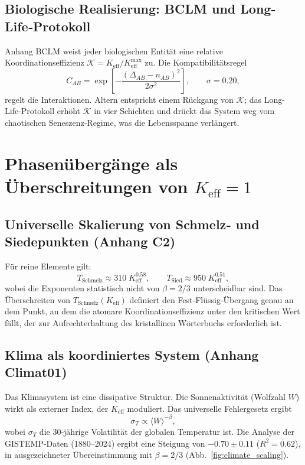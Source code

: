 \documentclass[12pt,a4paper]{article}
\newcommand{\Keff}{K_{\mathrm{eff}}}
\newcommand{\REL}{\mathcal{K}}
\begin{document}
	\subsection{Biologische Realisierung: BCLM und Long-Life‑Protokoll}
	
	Anhang BCLM weist jeder biologischen Entität eine relative Koordinationseffizienz
	$\REL = \Keff/\Keff^{\max}$ zu. Die Kompatibilitätsregel
	\[
	C_{AB} = \exp\!\left[-\frac{(\Delta_{AB} - n_{AB})^2}{2\sigma^2}\right],\qquad \sigma = 0.20,
	\]
	regelt die Interaktionen. Altern entspricht einem Rückgang von $\REL$; das Long-Life‑Protokoll
	erhöht $\REL$ in vier Schichten und drückt das System weg vom chaotischen Seneszenz‑Regime,
	was die Lebensspanne verlängert.
	
	\section{Phasenübergänge als Überschreitungen von $\Keff = 1$}
	
	\subsection{Universelle Skalierung von Schmelz‑ und Siedepunkten (Anhang C2)}
	
	Für reine Elemente gilt:
	\[
	T_{\text{Schmelz}} \approx 310\;\Keff^{0.58}, \qquad
	T_{\text{Sied}} \approx 950\;\Keff^{0.51},
	\]
	wobei die Exponenten statistisch nicht von $\beta = 2/3$ unterscheidbar sind. Das Überschreiten
	von $T_{\text{Schmelz}}(\Keff)$ definiert den Fest‑Flüssig‑Übergang genau an dem Punkt, an dem die
	atomare Koordinationseffizienz unter den kritischen Wert fällt, der zur Aufrechterhaltung des
	kristallinen Wörterbuchs erforderlich ist.
	
	\subsection{Klima als koordiniertes System (Anhang Climat01)}
	
	Das Klimasystem ist eine dissipative Struktur. Die Sonnenaktivität (Wolfzahl $W$)
	wirkt als externer Index, der $\Keff$ moduliert. Das universelle Fehlergesetz ergibt
	\[
	\sigma_T \propto \langle W \rangle^{-\beta},
	\]
	wobei $\sigma_T$ die 30‑jährige Volatilität der globalen Temperatur ist. Die Analyse der
	GISTEMP‑Daten (1880–2024) ergibt eine Steigung von $-0.70\pm0.11$ ($R^2=0.62$), in ausgezeichneter
	Übereinstimmung mit $\beta = 2/3$ (Abb.~\ref{fig:climate_scaling}).
	
\end{document}
